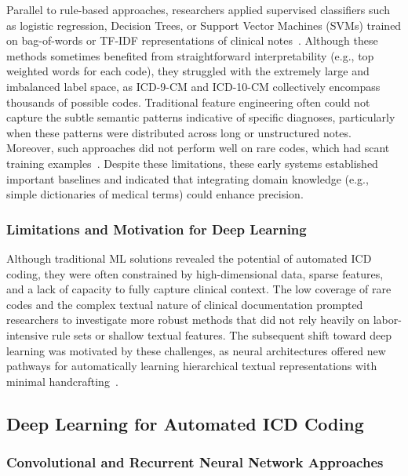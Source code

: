 Parallel to rule-based approaches, researchers applied supervised classifiers such as logistic regression, Decision Trees, or Support Vector Machines (SVMs) trained on bag-of-words or TF-IDF representations of clinical notes~\citep{perotte2014diagnosis}. Although these methods sometimes benefited from straightforward interpretability (e.g., top weighted words for each code), they struggled with the extremely large and imbalanced label space, as ICD-9-CM and ICD-10-CM collectively encompass thousands of possible codes. Traditional feature engineering often could not capture the subtle semantic patterns indicative of specific diagnoses, particularly when these patterns were distributed across long or unstructured notes. Moreover, such approaches did not perform well on rare codes, which had scant training examples~\citep{duque2021knowledge}. Despite these limitations, these early systems established important baselines and indicated that integrating domain knowledge (e.g., simple dictionaries of medical terms) could enhance precision.

\subsubsection{Limitations and Motivation for Deep Learning}

Although traditional ML solutions revealed the potential of automated ICD coding, they were often constrained by high-dimensional data, sparse features, and a lack of capacity to fully capture clinical context. The low coverage of rare codes and the complex textual nature of clinical documentation prompted researchers to investigate more robust methods that did not rely heavily on labor-intensive rule sets or shallow textual features. The subsequent shift toward deep learning was motivated by these challenges, as neural architectures offered new pathways for automatically learning hierarchical textual representations with minimal handcrafting~\citep{lecun2015deep}.

\subsection{Deep Learning for Automated ICD Coding}\label{sec:p1:deep-learning}

\subsubsection{Convolutional and Recurrent Neural Network Approaches}

